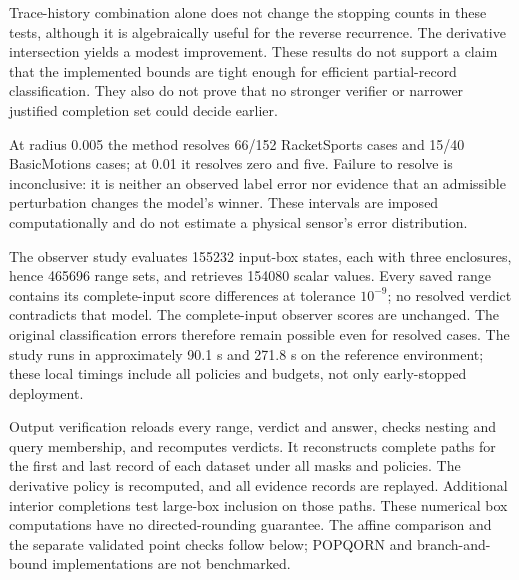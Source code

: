 \documentclass[11pt,a4paper]{article}
\theoremstyle{definition}\newtheorem{definition}[theorem]{Definition}
\begin{document}
\begin{table}[!htbp]\centering\small
\caption{Bound ablation on identical derivative-selected query paths. Entries are mean stopping counts. Structured bounds combine the original trace intervals with the compiled history enclosure; hybrid bounds additionally intersect the centered derivative enclosure.}
\label{tab:observerablation}
\end{table}
Trace-history combination alone does not change the stopping counts in these tests, although it is algebraically useful for the reverse recurrence. The derivative intersection yields a modest improvement. These results do not support a claim that the implemented bounds are tight enough for efficient partial-record classification. They also do not prove that no stronger verifier or narrower justified completion set could decide earlier.

\begin{table}[!htbp]\centering\small
\caption{Observer decisions resolved by hybrid bounds under synthetic coordinatewise uncertainty around the complete normalized record. Entries are resolved cases / total cases, not correct external labels.}
\label{tab:observernoise}
\end{table}
At radius 0.005 the method resolves 66/152 RacketSports cases and 15/40 BasicMotions cases; at 0.01 it resolves zero and five. Failure to resolve is inconclusive: it is neither an observed label error nor evidence that an admissible perturbation changes the model's winner. These intervals are imposed computationally and do not estimate a physical sensor's error distribution.

The observer study evaluates 155232 input-box states, each with three enclosures, hence 465696 range sets, and retrieves 154080 scalar values. Every saved range contains its complete-input score differences at tolerance $10^{-9}$; no resolved verdict contradicts that model. The complete-input observer scores are unchanged. The original classification errors therefore remain possible even for resolved cases. The study runs in approximately 90.1 s and 271.8 s on the reference environment; these local timings include all policies and budgets, not only early-stopped deployment.

Output verification reloads every range, verdict and answer, checks nesting and query membership, and recomputes verdicts. It reconstructs complete paths for the first and last record of each dataset under all masks and policies. The derivative policy is recomputed, and all evidence records are replayed. Additional interior completions test large-box inclusion on those paths. These numerical box computations have no directed-rounding guarantee. The affine comparison and the separate validated point checks follow below; POPQORN and branch-and-bound implementations are not benchmarked.
\end{document}
